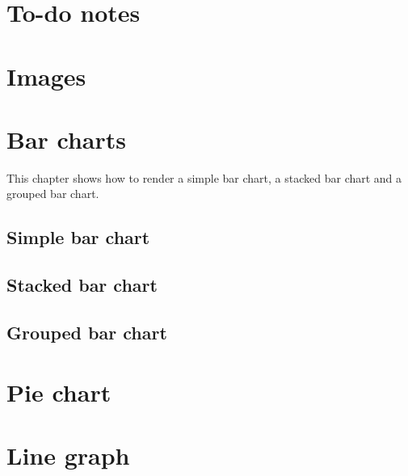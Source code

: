 

\chapter{To-do notes}



\chapter{Images}



\chapter{Bar charts}

This chapter shows how to render a simple bar chart, a stacked bar chart and a grouped bar chart.

\section{Simple bar chart}



\newpage

\section{Stacked bar chart}



\newpage

\section{Grouped bar chart}



\chapter{Pie chart}



\chapter{Line graph}

